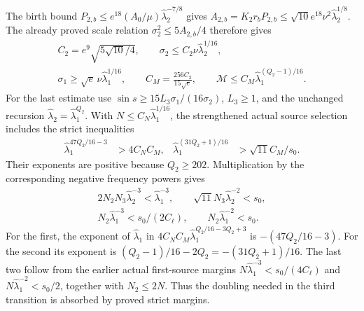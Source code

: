 The birth bound $P_{2,b}\leq e^{18}(A_0/\mu)
\widehat\lambda_2^{-7/8}$ gives
$A_{2,b}=K_2r_bP_{2,b}\leq\sqrt{10}e^{18}\nu^2
\widehat\lambda_2^{1/8}$. The already proved scale relation
$\sigma_2^2\leq5A_{2,b}/4$ therefore gives
\begin{equation}\label{cvlane:tts:sourceconstants}
 \begin{gathered}
 C_2=e^9\sqrt{5\sqrt{10}/4},\qquad
 \sigma_2\leq C_2\nu\widehat\lambda_2^{1/16},\\
 \sigma_1\geq\sqrt e\,\nu\widehat\lambda_1^{1/16},\qquad
 C_M=\frac{256C_2}{15\sqrt e},\qquad
 \mathcal M\leq C_M\widehat\lambda_1^{(Q_2-1)/16}.
 \end{gathered}
\end{equation}
For the last estimate use
$\sin s\geq15L_3\sigma_1/(16\sigma_2)$, $L_3\geq1$,
and the unchanged recursion
$\widehat\lambda_2=\widehat\lambda_1^{Q_2}$.
With $N\leq C_N\widehat\lambda_1^{1/16}$, the strengthened
actual source selection includes the strict inequalities
\begin{align}\label{cvlane:tts:sourceexponents}
 \widehat\lambda_1^{47Q_2/16-3}&>4C_NC_M,
 &\widehat\lambda_1^{(31Q_2+1)/16}&>\sqrt{11}C_M/s_0.
\end{align}
Their exponents are positive because $Q_2\geq202$.
Multiplication by the corresponding negative frequency powers gives
\begin{equation}\label{cvlane:tts:nestingnumbers}
 \begin{gathered}
 2N_2N_3\widehat\lambda_2^{-3}
       <\widehat\lambda_1^{-3},\qquad
 \sqrt{11}N_3\widehat\lambda_2^{-2}<s_0,\\
 N_2\widehat\lambda_1^{-3}<s_0/(2C_\ell),\qquad
 N_2\widehat\lambda_1^{-2}<s_0.
 \end{gathered}
\end{equation}
For the first, the exponent of $\widehat\lambda_1$ in
$4C_NC_M\widehat\lambda_1^{Q_2/16-3Q_2+3}$ is
$-(47Q_2/16-3)$. For the second its exponent is
$(Q_2-1)/16-2Q_2=-(31Q_2+1)/16$.
The last two follow from the earlier actual first-source margins
$N\widehat\lambda_1^{-3}<s_0/(4C_\ell)$ and
$N\widehat\lambda_1^{-2}<s_0/2$, together with $N_2\leq2N$.
Thus the doubling needed in the third transition is absorbed by
proved strict margins.

